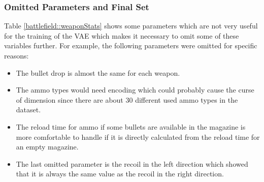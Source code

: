 \documentclass[MGS,Master,english]{twbook}%
\begin{document}
\subsubsection{Omitted Parameters and Final Set}
Table \ref{battlefield::weaponStats} shows some parameters which are not very useful for the training of the VAE which makes it necessary to omit some of these variables further. For example, the following parameters were omitted for specific reasons:
\begin{itemize}
	\item The bullet drop is almost the same for each weapon.
	\item The ammo types would need encoding which could probably cause the curse of dimension since there are about 30 different used ammo types in the dataset.
	\item The reload time for ammo if some bullets are available in the magazine is more comfortable to handle if it is directly calculated from the reload time for an empty magazine.
	\item The last omitted parameter is the recoil in the left direction which showed that it is always the same value as the recoil in the right direction.
\end{itemize}
\end{document}
